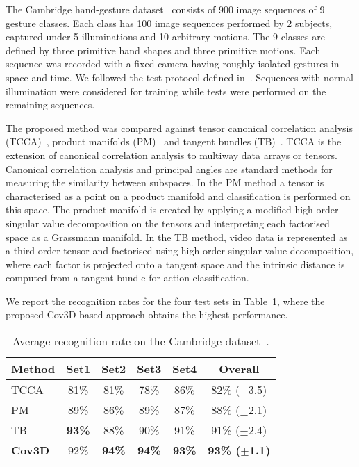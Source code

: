 \documentclass[10pt,twocolumn,letterpaper]{article}
\newcommand{\cov}{{Cov3D}}
\begin{document}
The Cambridge hand-gesture dataset~\cite{KimAndCipolla2009} consists of 900 image sequences of 9 gesture classes.
Each class has 100 image sequences performed by 2 subjects,
captured under 5 illuminations and 10 arbitrary motions.
The 9 classes are defined by three  primitive hand shapes and three primitive motions.
Each sequence was recorded with a fixed camera having roughly isolated gestures in space and time.
We followed the test protocol defined in~\cite{KimAndCipolla2009}.
Sequences with normal illumination were considered for training while tests were performed on the remaining sequences.

The proposed method was compared against tensor canonical correlation analysis (TCCA)~\cite{KimAndCipolla2009}, product manifolds
(PM)~\cite{LuiEtAl2010} and tangent bundles (TB)~\cite{Lui2010}. TCCA is the extension of canonical correlation analysis to multiway data arrays or
tensors. Canonical correlation analysis and principal angles are standard methods for measuring the similarity between subspaces.
In the PM method a tensor is characterised as a point on a product manifold and  classification is performed on this space. The product manifold is
created by applying a modified high order singular value decomposition on the tensors and interpreting each factorised space as a Grassmann manifold.
In the TB method, video data is represented as a third order tensor and factorised using high order singular value decomposition, where each factor is
projected onto a tangent space and the intrinsic distance is computed from a tangent bundle for action classification.

We report the recognition rates for the four test sets in Table~\ref{tab:hands_rates},
where the proposed \cov-based approach obtains the highest performance.

\begin{table}[!tb]
  \centering
  \footnotesize
  \begin{tabular}{lccccc}
    \toprule
    \bf{Method}                   &\bf{Set1} &\bf{Set2} &\bf{Set3} &\bf{Set4} &\bf{Overall}\\
    \midrule[\heavyrulewidth]
    TCCA~\cite{KimAndCipolla2009} &81\%      &81\%      &78\%      &86\%      &82\% ($\pm$3.5)\\
    PM~\cite{LuiEtAl2010}         &89\%      &86\%      &89\%      &87\%      &88\% ($\pm$2.1)\\
    TB~\cite{Lui2010}             &\bf{93\%} &88\%      &90\%      &91\%      &91\% ($\pm$2.4)\\
    \bf{\cov}                     &92\%      &\bf{94\%} &\bf{94\%} &\bf{93\%} &\bf{93\% ($\pm$1.1)}\\
    \bottomrule
  \end{tabular}
  
  ~
  
  \caption
    {
    \small
    Average recognition rate on the Cambridge dataset~\cite{KimAndCipolla2009}.
    }
  \label{tab:hands_rates}
\end{table}
\end{document}
